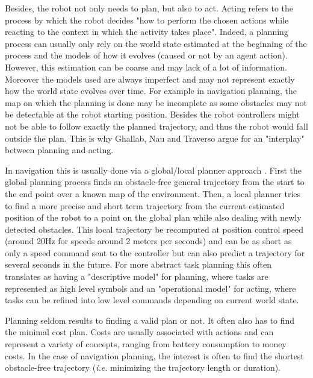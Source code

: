 \documentclass[a4paper,11pt,twoside]{StyleThese}
\begin{document}
Besides, the robot not only needs to plan, but also to act. Acting refers to the process by which the robot decides "how to perform the chosen actions while reacting to the context in which the activity takes place". Indeed, a planning process can usually only rely on the world state estimated at the beginning of the process and the models of how it evolves (caused or not by an agent action). However, this estimation can be coarse and may lack of a lot of information. Moreover the models used are always imperfect and may not represent exactly how the world state evolves over time. For example in navigation planning, the map on which the planning is done may be incomplete as some obstacles may not be detectable at the robot starting position. Besides the robot controllers might not be able to follow exactly the planned trajectory, and thus the robot would fall outside the plan. This is why Ghallab, Nau and Traverso argue for an "interplay" between planning and acting.

In navigation this is usually done via a global/local planner approach \cite{choset2005principles}. First the global planning process finds an obstacle-free general trajectory from the start to the end point over a known map of the environment. Then, a local planner tries to find a more precise and short term trajectory from the current estimated position of the robot to a point on the global plan while also dealing with newly detected obstacles. This local trajectory be recomputed at position control speed (around 20Hz for speeds around 2 meters per seconds) and can be as short as only a speed command sent to the controller but can also predict a trajectory for several seconds in the future. For more abstract task planning this often translates as having a "descriptive model" for planning, where tasks are represented as high level symbols and an "operational model" for acting, where tasks can be refined into low level commands depending on current world state.

Planning seldom results to finding a valid plan or not. It often also has to find the minimal cost plan. Costs are usually associated with actions and can represent a variety of concepts, ranging from battery consumption to money costs. In the case of navigation planning, the interest is often to find the shortest obstacle-free trajectory (\textit{i.e.} minimizing the trajectory length or duration).
\end{document}
